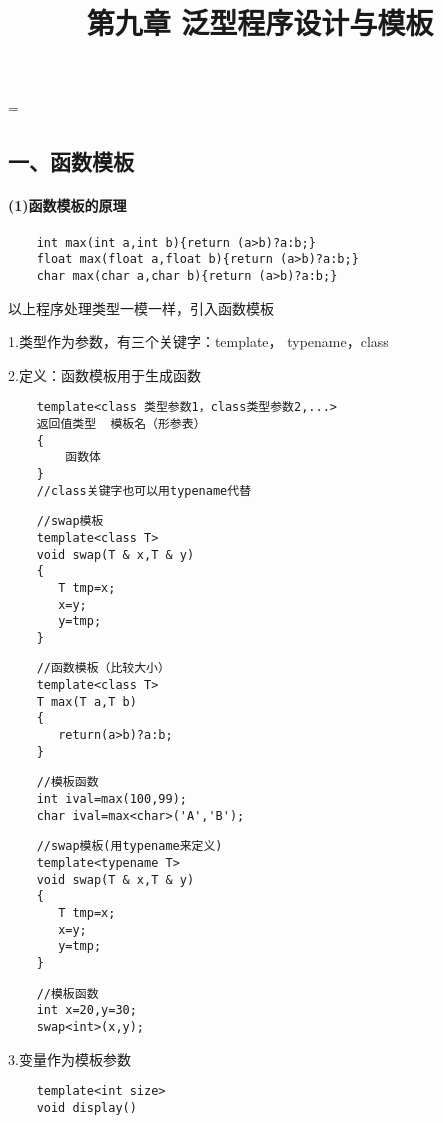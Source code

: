 \documentclass{article}
\begin{document}
 
\hfuzz=\maxdimen
{}
\begin{CJK}{UTF8}{gbsn}  
\title{第九章  泛型程序设计与模板}
\author{}
\date{}
\maketitle
\part*{一、函数模板}
\subsection*{(1)函数模板的原理}
\begin{verbatim}
    int max(int a,int b){return (a>b)?a:b;}
    float max(float a,float b){return (a>b)?a:b;}
    char max(char a,char b){return (a>b)?a:b;}
\end{verbatim}
\subparagraph*{}
以上程序处理类型一模一样，引入函数模板
\subparagraph*{}
1.类型作为参数，有三个关键字：template， typename，class
\subparagraph*{}
2.定义：函数模板用于生成函数
\begin{verbatim}
    template<class 类型参数1，class类型参数2,...>
    返回值类型  模板名（形参表）
    {
        函数体
    }
    //class关键字也可以用typename代替
\end{verbatim}
\begin{verbatim}
    //swap模板
    template<class T>
    void swap(T & x,T & y)
    {
       T tmp=x;
       x=y;
       y=tmp;
    }
\end{verbatim} 
\begin{verbatim}
    //函数模板（比较大小）
    template<class T>
    T max(T a,T b)
    {
       return(a>b)?a:b;
    }
\end{verbatim}
\begin{verbatim}
    //模板函数
    int ival=max(100,99);
    char ival=max<char>('A','B');
\end{verbatim}
\begin{verbatim}
    //swap模板(用typename来定义)
    template<typename T>
    void swap(T & x,T & y)
    {
       T tmp=x;
       x=y;
       y=tmp;
    }
\end{verbatim}
\begin{verbatim}
    //模板函数
    int x=20,y=30;
    swap<int>(x,y);
\end{verbatim}
\subparagraph*{}
3.变量作为模板参数
\begin{verbatim}
    template<int size>
    void display()

\end{verbatim}
\end{CJK}
\end{document}
